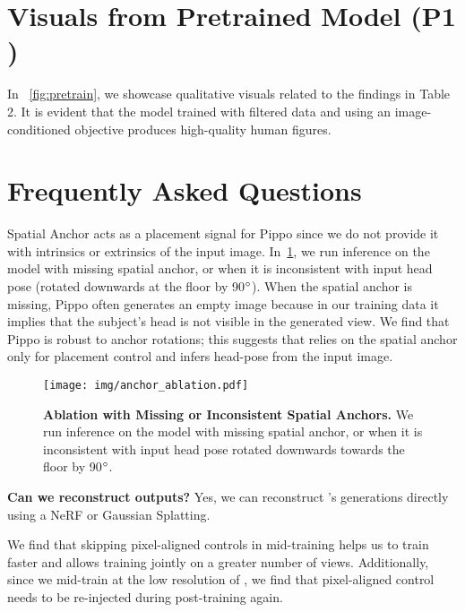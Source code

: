 {\section{Visuals from Pretrained Model (P1  )}\label{app_sec:pretrain}

In ~\cref{fig:pretrain}, we showcase qualitative visuals related to the findings in Table 2. It is evident that the model trained with filtered data and using an image-conditioned objective produces high-quality human figures.

\section{Frequently Asked Questions}

Spatial Anchor acts as a placement signal for Pippo since we do not provide it with intrinsics or extrinsics of the input image. In~\cref{fig:anchor_ablation}, we run inference on the \upperbody {} model with missing spatial anchor, or when it is inconsistent with input head pose (rotated downwards at the floor by 90$^{\circ}$). When the spatial anchor is missing, Pippo often generates an empty image because in our training data it implies that the subject's head is not visible in the generated view. We find that Pippo is robust to anchor rotations; this suggests that \ourmodel relies on the spatial anchor only for placement control and infers head-pose from the input image. 

\begin{figure}[h!]
    \centering    
    \texttt{[image: img/anchor\_ablation.pdf]}
    \caption{\textbf{Ablation with Missing or Inconsistent Spatial Anchors.} We run inference on the \upperbody {} model with missing spatial anchor, or when it is inconsistent with input head pose rotated downwards towards the floor by 90$^{\circ}$.}
    \label{fig:anchor_ablation}
\end{figure}

\noindent\textbf{Can we reconstruct \ourmodel outputs?} 
Yes, we can reconstruct \ourmodel's generations directly using a NeRF or Gaussian Splatting. 

We find that skipping pixel-aligned controls in mid-training helps us to train faster and allows training jointly on a greater number of views. Additionally, since we mid-train at the low resolution of \resone, we find that pixel-aligned control needs to be re-injected during post-training again.

}
